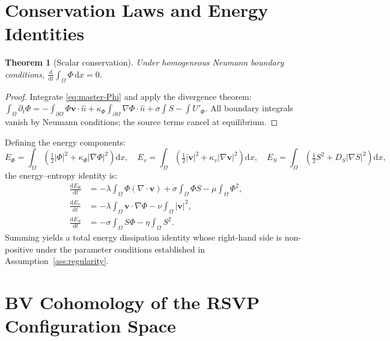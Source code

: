 \documentclass[12pt, a4paper]{article}
\theoremstyle{plain}
\newtheorem{theorem}{Theorem}[section]
\theoremstyle{definition}
\theoremstyle{remark}
\newcommand{\vfield}{\mathbf{v}}
\begin{document}

\appendix

\section{Conservation Laws and Energy Identities}
\label{app:conservation}

\begin{theorem}[Scalar conservation]
Under homogeneous Neumann boundary conditions,
$\frac{\mathrm{d}}{\mathrm{d}t}\int_\Omega\Phi\,\mathrm{d}x = 0$.
\end{theorem}

\begin{proof}
Integrate \eqref{eq:master-Phi} and apply the divergence theorem:
$\int_\Omega\partial_t\Phi = -\int_{\partial\Omega}\Phi\vfield\cdot\hat{n} + \kappa_\Phi\int_{\partial\Omega}\nabla\Phi\cdot\hat{n} + \sigma\int S - \int U'_\Phi$.
All boundary integrals vanish by Neumann conditions; the source terms cancel at equilibrium.
\end{proof}

Defining the energy components:
\[
E_\Phi = \int_\Omega\!\left(\tfrac{1}{2}|\Phi|^2 + \kappa_\Phi|\nabla\Phi|^2\right)\mathrm{d}x,\quad
E_v = \int_\Omega\!\left(\tfrac{1}{2}|\vfield|^2 + \kappa_v|\nabla\vfield|^2\right)\mathrm{d}x,\quad
E_S = \int_\Omega\!\left(\tfrac{1}{2}S^2 + D_S|\nabla S|^2\right)\mathrm{d}x,
\]
the energy--entropy identity is:
\begin{align}
\frac{\mathrm{d}E_\Phi}{\mathrm{d}t} &= -\lambda\int_\Omega\Phi(\nabla\cdot\vfield)
+ \sigma\int_\Omega\Phi S - \mu\int_\Omega\Phi^2,\\
\frac{\mathrm{d}E_v}{\mathrm{d}t} &= -\lambda\int_\Omega\vfield\cdot\nabla\Phi
- \nu\int_\Omega|\vfield|^2,\\
\frac{\mathrm{d}E_S}{\mathrm{d}t} &= -\sigma\int_\Omega S\Phi - \eta\int_\Omega S^2.
\end{align}
Summing yields a total energy dissipation identity whose right-hand side is non-positive
under the parameter conditions established in Assumption~\ref{ass:regularity}.

\section{BV Cohomology of the RSVP Configuration Space}
\label{app:bv}
\end{document}
